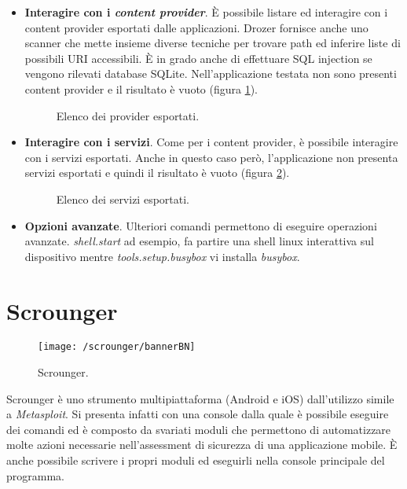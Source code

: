 \begin{itemize}
	\item \textbf{Interagire con i \emph{content provider}}. È possibile listare ed interagire con i content provider esportati dalle applicazioni. Drozer fornisce anche uno scanner che mette insieme diverse tecniche per trovare path ed inferire liste di possibili URI accessibili. È in grado anche di effettuare SQL injection se vengono rilevati database SQLite. Nell'applicazione testata non sono presenti content provider e il risultato è vuoto (figura \ref{fig:provider}).
	\begin{figure}[h]
		\centering 
		\caption{Elenco dei provider esportati.}
		\label{fig:provider}
	\end{figure}

	\item \textbf{Interagire con i servizi}. Come per i content provider, è possibile interagire con i servizi esportati. Anche in questo caso però, l'applicazione non presenta servizi esportati e quindi il risultato è vuoto (figura \ref{fig:services}).
	\begin{figure}[h]
		\centering 
		\caption{Elenco dei servizi esportati.}
		\label{fig:services}
	\end{figure}

	\item \textbf{Opzioni avanzate}. Ulteriori comandi permettono di eseguire operazioni avanzate. \emph{shell.start} ad esempio, fa partire una shell linux interattiva sul dispositivo mentre \emph{tools.setup.busybox} vi installa \emph{busybox}.
\end{itemize}


\section{Scrounger}
\begin{figure}[h]
	\centering 
	\texttt{[image: /scrounger/bannerBN]} 
	\caption{Scrounger.}
	\label{fig:scrounger}
\end{figure}
Scrounger\cite{Scrounger} è uno strumento multipiattaforma (Android e iOS) dall'utilizzo simile a \emph{Metasploit}. Si presenta infatti con una console dalla quale è possibile eseguire dei comandi ed è composto da svariati moduli che permettono di automatizzare molte azioni necessarie nell'assessment di sicurezza di una applicazione mobile. È anche possibile scrivere i propri moduli ed eseguirli nella console principale del programma.

